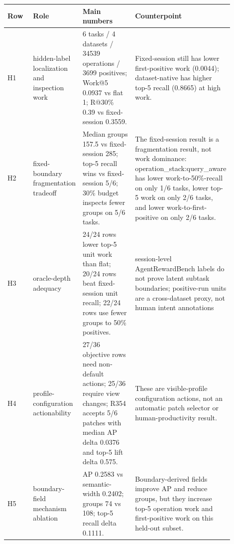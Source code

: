 \begin{tabular}{p{0.13\linewidth}p{0.18\linewidth}p{0.31\linewidth}p{0.28\linewidth}}
  \toprule
  Row & Role & Main numbers & Counterpoint \\
  \midrule
  H1 & hidden-label localization and inspection work & 6 tasks / 4 datasets / 34539 operations / 3699 positives; Work@5 0.0937 vs flat 1; R@30\% 0.39 vs fixed-session 0.3559. & Fixed-session still has lower first-positive work (0.0044); dataset-native has higher top-5 recall (0.8665) at high work. \\
  H2 & fixed-boundary fragmentation tradeoff & Median groups 157.5 vs fixed-session 285; top-5 recall wins vs fixed-session 5/6; 30\% budget inspects fewer groups on 5/6 tasks. & The fixed-session result is a fragmentation result, not work dominance: operation\_stack:query\_aware has lower work-to-50\%-recall on only 1/6 tasks, lower top-5 work on only 2/6 tasks, and lower work-to-first-positive on only 2/6 tasks. \\
  H3 & oracle-depth adequacy & 24/24 rows lower top-5 unit work than flat; 20/24 rows beat fixed-session unit recall; 22/24 rows use fewer groups to 50\% positives. & session-level AgentRewardBench labels do not prove latent subtask boundaries; positive-run units are a cross-dataset proxy, not human intent annotations \\
  H4 & profile-configuration actionability & 27/36 objective rows need non-default actions; 25/36 require view changes; R354 accepts 5/6 patches with median AP delta 0.0376 and top-5 lift delta 0.575. & These are visible-profile configuration actions, not an automatic patch selector or human-productivity result. \\
  H5 & boundary-field mechanism ablation & AP 0.2583 vs semantic-width 0.2402; groups 74 vs 108; top-5 recall delta 0.1111. & Boundary-derived fields improve AP and reduce groups, but they increase top-5 operation work and first-positive work on this held-out subset. \\
  \bottomrule
\end{tabular}
